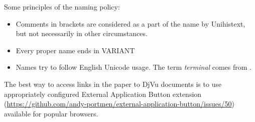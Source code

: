 \documentclass{article}
\begin{document}
Some principles of the naming policy:
\begin{itemize}
\item Comments in brackets are considered as a part of the name by
  \textsf{Unihistext}, but not necessarily in other circumstances.
\item Every proper name ends in VARIANT
\item Names try to follow English Unicode usage. The term
  \textit{terminal} comes from
  \autocite{gaskell76:_nomec_letter_roman_type}.

\end{itemize}

The best way to access links in the paper to DjVu documents is to use
appropriately configured External Application Button extension
(\url{https://github.com/andy-portmen/external-application-button/issues/50})
available for popular browsers.
\end{document}
